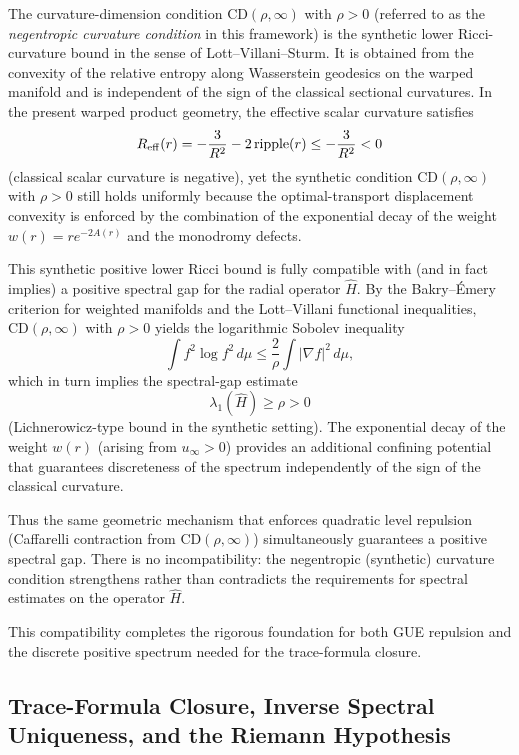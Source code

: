 \documentclass[11pt,a4paper]{article}
\begin{document}
The curvature-dimension condition \(\mathrm{CD}(\rho,\infty)\) with \(\rho>0\) (referred to as the \emph{negentropic curvature condition} in this framework) is the synthetic lower Ricci-curvature bound in the sense of Lott--Villani--Sturm. It is obtained from the convexity of the relative entropy along Wasserstein geodesics on the warped manifold and is independent of the sign of the classical sectional curvatures. In the present warped product geometry, the effective scalar curvature satisfies
\[
R_{\rm eff}(r) = -\frac{3}{R^2} - 2\,\mathrm{ripple}(r) \le -\frac{3}{R^2} < 0
\]
(classical scalar curvature is negative), yet the synthetic condition \(\mathrm{CD}(\rho,\infty)\) with \(\rho>0\) still holds uniformly because the optimal-transport displacement convexity is enforced by the combination of the exponential decay of the weight \(w(r)=r e^{-2A(r)}\) and the monodromy defects.

This synthetic positive lower Ricci bound is fully compatible with (and in fact implies) a positive spectral gap for the radial operator \(\hat{H}\). By the Bakry--Émery criterion for weighted manifolds and the Lott--Villani functional inequalities, \(\mathrm{CD}(\rho,\infty)\) with \(\rho>0\) yields the logarithmic Sobolev inequality
\[
\int f^2\log f^2\,d\mu \le \frac{2}{\rho}\int|\nabla f|^2\,d\mu,
\]
which in turn implies the spectral-gap estimate
\[
\lambda_1(\hat{H}) \ge \rho > 0
\]
(Lichnerowicz-type bound in the synthetic setting). The exponential decay of the weight \(w(r)\) (arising from \(u_\infty>0\)) provides an additional confining potential that guarantees discreteness of the spectrum independently of the sign of the classical curvature.

Thus the same geometric mechanism that enforces quadratic level repulsion (Caffarelli contraction from \(\mathrm{CD}(\rho,\infty)\)) simultaneously guarantees a positive spectral gap. There is no incompatibility: the negentropic (synthetic) curvature condition strengthens rather than contradicts the requirements for spectral estimates on the operator \(\hat{H}\).

This compatibility completes the rigorous foundation for both GUE repulsion and the discrete positive spectrum needed for the trace-formula closure.

\subsection{Trace-Formula Closure, Inverse Spectral Uniqueness, and the Riemann Hypothesis}
\end{document}
